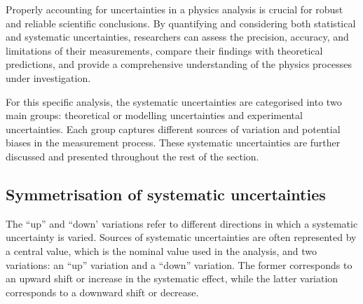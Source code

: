 Properly accounting for uncertainties in a physics analysis is crucial for robust and reliable scientific 
conclusions. By quantifying and considering both statistical and systematic uncertainties, researchers 
can assess the precision, accuracy, and limitations of their measurements, compare their findings with 
theoretical predictions, and provide a comprehensive understanding of the physics processes under 
investigation.



For this specific analysis, the systematic uncertainties are categorised into two main groups: 
theoretical or modelling uncertainties and experimental uncertainties. Each group 
captures different sources of variation and potential biases in the measurement process. These 
systematic uncertainties are further discussed and presented throughout the rest of the section.


\subsection{Symmetrisation of systematic uncertainties}
\label{sec:ChaptH:Systematics:Sym}
The ``up'' and ``down' variations refer to different directions in which a systematic uncertainty is varied.
Sources of systematic uncertainties are often represented by a central value, which is the nominal value used in 
the analysis, and two variations: an ``up'' variation and a ``down'' variation. The former
corresponds to an upward shift or increase in the systematic effect, while the latter variation corresponds 
to a downward shift or decrease. 

